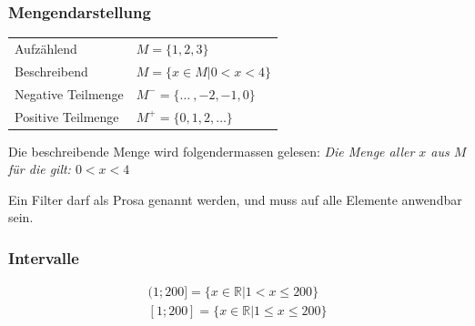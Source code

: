\begin{multicols}{2}
\subsubsection{Mengendarstellung}
	\begin{tabular}{l l}
		Aufzählend & $M = \{1,2,3\}$ \\
		Beschreibend & $M = \{x \in M|0<x<4\}$ \\
		Negative Teilmenge & $M^-= \{\dots\ ,-2,-1,0\}$ \\
		Positive Teilmenge & $M^+= \{0,1,2,\dots\}$
	\end{tabular}
	
	Die beschreibende Menge wird folgendermassen gelesen:
	\emph{Die Menge aller $x$ aus $M$ für die gilt: $0<x<4$} 
	
	Ein Filter darf als Prosa genannt werden, und muss auf alle Elemente anwendbar sein.

\subsubsection{Intervalle}
	\begin{align*}
		(1;200] = \{x \in\mathbb{R}|1<x \leq 200\} \\
		[1;200] = \{x\in\mathbb{R}|1\leq x \leq 200\}
	\end{align*}

\end{multicols}

